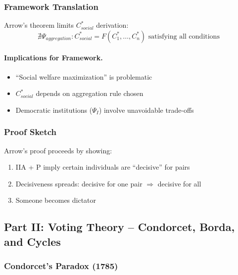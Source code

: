 \subsubsection{Framework Translation}

Arrow's theorem limits $C^*_{social}$ derivation:
\begin{equation}
\nexists \Psi_{aggregation}: C^*_{social} = F(C^*_1, \ldots, C^*_n) \text{ satisfying all conditions}
\end{equation}

\paragraph{Implications for Framework.}
\begin{itemize}
    \item ``Social welfare maximization'' is problematic
    \item $C^*_{social}$ depends on aggregation rule chosen
    \item Democratic institutions ($\Psi_I$) involve unavoidable trade-offs
\end{itemize}

\subsubsection{Proof Sketch}

Arrow's proof proceeds by showing:
\begin{enumerate}
    \item IIA + P imply certain individuals are ``decisive'' for pairs
    \item Decisiveness spreads: decisive for one pair $\Rightarrow$ decisive for all
    \item Someone becomes dictator
\end{enumerate}

\subsection{Part II: Voting Theory – Condorcet, Borda, and Cycles}

\subsubsection{Condorcet's Paradox (1785)}

